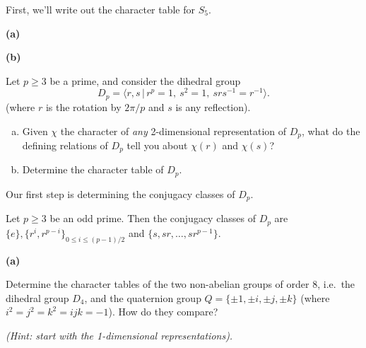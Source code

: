 \documentclass[11pt,letterpaper]{article}
\begin{document}
First, we'll write out the character table for $S_5$.



\textbf{(a)}

\textbf{(b)}

\pagebreak
\begin{problem}
    Let $p\ge 3$ be a prime, and consider the dihedral group 
    \[
        D_p=\langle r,s\,|\,r^p=1,\ s^2=1,\ srs^{-1}=r^{-1}\rangle
    .\] 
    (where $r$ is the rotation by $2\pi/p$ and $s$ is any reflection).
    \begin{enumerate}[(a)]
        \item Given $\chi$ the character of {\em any} 2-dimensional representation of $D_p$, what do the defining relations of $D_p$ tell you about $\chi(r)$ and $\chi(s)$?
        \item Determine the character table of $D_p$.
    \end{enumerate}
\end{problem}

Our first step is determining the conjugacy classes of $D_p$.

\begin{lemma}
    Let $p\geq 3$ be an odd prime. Then the conjugacy classes of $D_p$ are $\{e\}, \{r^i, r^{p-i}\}_{0\leq i\leq (p-1)/{2}}$ and $\{s, sr, \ldots, sr^{p-1}\}$.
\end{lemma}

\textbf{(a)}

\pagebreak
\begin{problem}
    Determine the character tables of the two non-abelian groups of order 8, i.e.\ the dihedral group $D_4$, and the quaternion group $Q=\{\pm 1,\pm i,\pm j,\pm k\}$ (where $i^2=j^2=k^2=ijk=-1$). How do they compare?
\end{problem}
\textit{(Hint: start with the 1-dimensional representations).}
\end{document}
